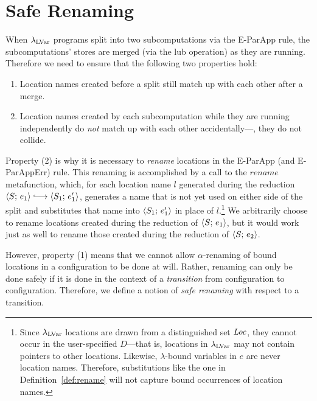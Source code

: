 \section{Safe Renaming}\label{appendix:renaming-lemmas}

When $\textup{\ensuremath{\lambda_{\textrm{LVar}}}}$ programs split into
two subcomputations via the {\sc E-ParApp} rule, 
the subcomputations' stores are merged (via the lub operation)
as they are running.
Therefore we need to ensure that the following two properties hold:
\begin{enumerate}
\item Location names created before a split still match up with each
  other after a merge.
\item Location names created by each subcomputation while they are running
  independently do \emph{not} match up with each other accidentally---\ie, they
  do not collide.
\end{enumerate}
Property (2) is why it is necessary to \emph{rename} locations in the
{\sc E-ParApp} (and {\sc E-ParAppErr}) rule.  
This renaming is accomplished by
a call to the $\mathit{rename}$ metafunction,
which, for each location name $l$ generated during the reduction $\config{S}{e_1} \parstepsto \config{S_1}{e'_1}$,
generates a name that is not yet used on either side of the split
and substitutes that name into $\langle S_1;\, e'_1 \rangle$ in place of $l$.\footnote{Since
$\textup{\ensuremath{\lambda_{\textrm{LVar}}}}$ locations are drawn from a distinguished set $\mathit{Loc}$,
they cannot occur in the user-specified $D$---that
is, locations in $\textup{\ensuremath{\lambda_{\textrm{LVar}}}}$ may not contain pointers to other
locations.  Likewise, $\lambda$-bound variables in $e$ are never location names.  Therefore, substitutions
like the one in Definition~\ref{def:rename} will not capture bound occurrences
of location names.} 
We arbitrarily choose to rename locations
  created during the reduction of $\langle S;\, e_1 \rangle$, but it would work just as well to rename
  those created during the reduction of $\langle S;\, e_2 \rangle$.

\DefRename

\noindent However, property (1) means that we cannot allow 
$\alpha$-renaming of bound locations in a configuration to be done at will.
Rather, renaming can only be done safely if it is done in the context of a \emph{transition}
from configuration to configuration.
Therefore, we define a notion of \emph{safe renaming} with respect to
a transition.

\DefRenaming

\DefSafeRenaming

\vfill\eject

